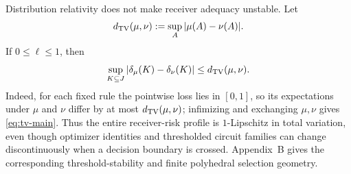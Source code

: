 Distribution relativity does not make receiver adequacy unstable. Let
\[
d_{\operatorname{TV}}(\mu,\nu):=\sup_A|\mu(A)-\nu(A)|.
\]
If $0\le\ell\le1$, then
\begin{equation}
\sup_{K\subseteq J}|\delta_\mu(K)-\delta_\nu(K)|
\le d_{\operatorname{TV}}(\mu,\nu).
\label{eq:tv-main}
\end{equation}
Indeed, for each fixed rule the pointwise loss lies in $[0,1]$, so its expectations under $\mu$ and $\nu$ differ by at most $d_{\operatorname{TV}}(\mu,\nu)$; infimizing and exchanging $\mu,\nu$ gives \eqref{eq:tv-main}. Thus the entire receiver-risk profile is $1$-Lipschitz in total variation, even though optimizer identities and thresholded circuit families can change discontinuously when a decision boundary is crossed. Appendix~B gives the corresponding threshold-stability and finite polyhedral selection geometry.
